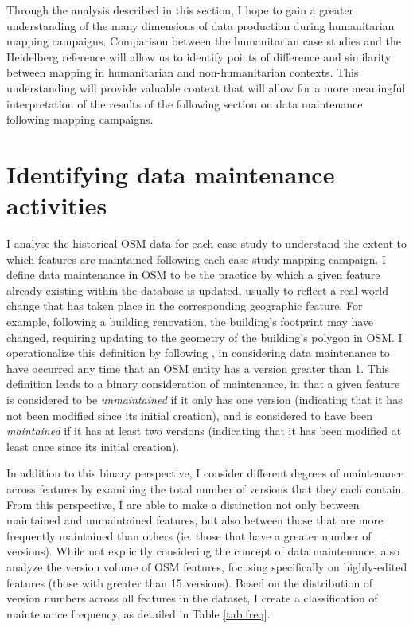 Through the analysis described in this section, I hope to gain a greater understanding of the many dimensions of data production during humanitarian mapping campaigns. Comparison between the humanitarian case studies and the Heidelberg reference will allow us to identify points of difference and similarity between mapping in humanitarian and non-humanitarian contexts. This understanding will provide valuable context that will allow for a more meaningful interpretation of the results of the following section on data maintenance following mapping campaigns.

\section{Identifying data maintenance activities}
\label{sec-maint}

I analyse the historical OSM data for each case study to understand the extent to which features are maintained following each case study mapping campaign. I define data maintenance in OSM to be the practice by which a given feature already existing within the database is updated, usually to reflect a real-world change that has taken place in the corresponding geographic feature.  For example, following a building renovation, the building's footprint may have changed, requiring updating to the geometry of the building's polygon in OSM. 
I operationalize this definition by following \textcite{quattrone_work_2017}, in considering data maintenance to have occurred any time that an OSM entity has a version greater than 1. This definition leads to a binary consideration of maintenance, in that a given feature is considered to be \textit{unmaintained} if it only has one version (indicating that it has not been modified since its initial creation), and is considered to have been \textit{maintained} if it has at least two versions (indicating that it has been modified at least once since its initial creation).  

In addition to this binary perspective, I consider different degrees of maintenance across features by examining the total number of versions that they each contain. From this perspective, I are able to make a distinction not only between maintained and unmaintained features, but also between those that are more frequently maintained than others (ie. those that have a greater number of versions). While not explicitly considering the concept of data maintenance, \textcite{mooney_characteristics_2012} also analyze the version volume of OSM features, focusing specifically on highly-edited features (those with greater than 15 versions). Based on the distribution of version numbers across all features in the dataset, I create a classification of maintenance frequency, as detailed in Table \ref{tab:freq}. 

